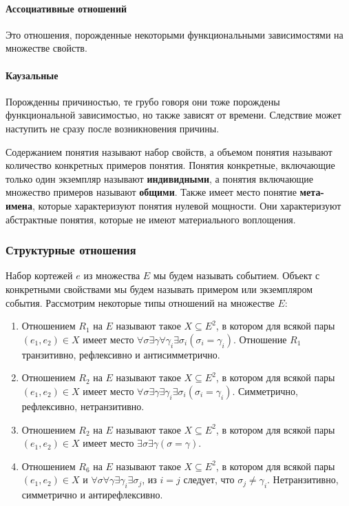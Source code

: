 \paragraph{Ассоциативные отношений}
Это отношения, порожденные некоторыми функциональными зависимостями на множестве свойств.
\paragraph{Каузальные}
Порожденны причиностью, те грубо говоря они тоже порождены функциональной зависимостью, но также зависят от времени. Следствие может наступить не сразу после возникновения причины.

Содержанием понятия называют набор свойств, а объемом понятия называют количество конкретных примеров понятия. Понятия конкретные, включающие только один экземпляр называют \textbf{индивидными}, а понятия включающие множество примеров называют \textbf{общими}. Также имеет место понятие \textbf{мета-имена}, которые характеризуют понятия нулевой мощности. Они характеризуют абстрактные понятия, которые не имеют материального воплощения.

\subsubsection{Структурные отношения}
Набор кортежей $e$ из множества $E$ мы будем называть событием. Объект с конкретными свойствами мы будем называть примером или экземпляром события. Рассмотрим некоторые типы отношений на множестве $E$:
\begin{enumerate}
	\item Отношением $R_1$ на $E$ называют такое $X\subseteq{}E^2$, в котором для всякой пары $(e_1,e_2)\in{}X$ имеет место $\forall{}\sigma\exists{}\gamma\forall{}\gamma_i\exists\sigma_i(\sigma_i=\gamma_i)$.
	Отношение $R_1$ транзитивно, рефлексивно и антисимметрично.
	\item Отношением $R_2$ на $E$ называют такое $X\subseteq{}E^2$, в котором для всякой пары $(e_1,e_2)\in{}X$ имеет место $\forall{}\sigma\exists{}\gamma\exists{}\gamma_i\exists\sigma_i(\sigma_i=\gamma_i)$.
	Симметрично, рефлексивно, нетранзитивно.
	\item Отношением $R_2$ на $E$ называют такое $X\subseteq{}E^2$, в котором для всякой пары $(e_1,e_2)\in{}X$ имеет место $\exists\sigma\exists\gamma(\sigma=\gamma)$.
	\item Отношением $R_6$ на $E$ называют такое $X\subseteq{}E^2$, в котором для всякой пары $(e_1,e_2)\in{}X$ и $\forall{}\sigma\forall{}\gamma\exists{}\gamma_i\exists\sigma_j$, из $i=j$ следует, что $\sigma_j\not=\gamma_i$.
	Нетранзитивно, симметрично и антирефлексивно.
\end{enumerate}

